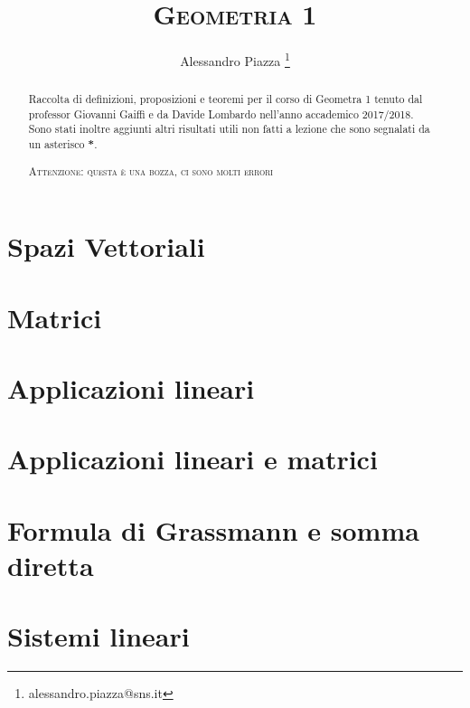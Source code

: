 \documentclass[9pt, a4paper]{article}
\title{\textsc{Geometria 1}}
\author{Alessandro Piazza \thanks{alessandro.piazza@sns.it}}
\theoremstyle{mythm}
\begin{document}
\maketitle

\begin{abstract}
	Raccolta di definizioni, proposizioni e teoremi per il corso di Geometra 1 tenuto dal professor Giovanni Gaiffi e da Davide Lombardo nell'anno accademico 2017/2018. \\
	Sono stati inoltre aggiunti altri risultati utili non fatti a lezione che sono segnalati da un asterisco \textbf{*}. 
	\begin{center}
		\textsc{Attenzione: questa è una bozza, ci sono molti errori}
	\end{center}
\end{abstract}

\tableofcontents

\clearpage

\section{Spazi Vettoriali}


\clearpage

\section{Matrici}


\clearpage

\section{Applicazioni lineari}


\clearpage

\section{Applicazioni lineari e matrici}


\clearpage

\section{Formula di Grassmann e somma diretta}


\clearpage

\section{Sistemi lineari}

\end{document}
